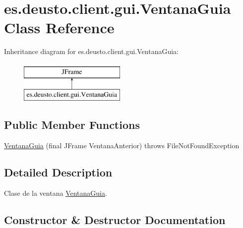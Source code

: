 \hypertarget{classes_1_1deusto_1_1client_1_1gui_1_1_ventana_guia}{}\section{es.\+deusto.\+client.\+gui.\+Ventana\+Guia Class Reference}
\label{classes_1_1deusto_1_1client_1_1gui_1_1_ventana_guia}
Inheritance diagram for es.\+deusto.\+client.\+gui.\+Ventana\+Guia\+:\begin{figure}[H]
\begin{center}
\leavevmode
\includegraphics[height=2.000000cm]{classes_1_1deusto_1_1client_1_1gui_1_1_ventana_guia}
\end{center}
\end{figure}
\subsection*{Public Member Functions}
\begin{DoxyCompactItemize}
\item 
\mbox{\hyperlink{classes_1_1deusto_1_1client_1_1gui_1_1_ventana_guia_aa88aea5fa0905b6cb4a629132b0c23bc}{Ventana\+Guia}} (final J\+Frame Ventana\+Anterior)  throws File\+Not\+Found\+Exception 
\end{DoxyCompactItemize}


\subsection{Detailed Description}
Clase de la ventana \mbox{\hyperlink{classes_1_1deusto_1_1client_1_1gui_1_1_ventana_guia}{Ventana\+Guia}}. 

\subsection{Constructor \& Destructor Documentation}
\mbox{\label{classes_1_1deusto_1_1client_1_1gui_1_1_ventana_guia_aa88aea5fa0905b6cb4a629132b0c23bc}} 
